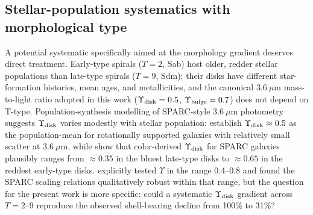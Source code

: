 \documentclass[linenumbers]{aastex701}
\newcommand{\Yt}{\Upsilon}
\newcommand{\Ydisk}{\Upsilon_{\rm disk}}
\newcommand{\Ybulge}{\Upsilon_{\rm bulge}}
\begin{document}
\subsection{Stellar-population systematics with morphological type}\label{sec:yt}

A potential systematic specifically aimed at the morphology gradient deserves direct treatment. Early-type spirals ($T=2$, Sab) host older, redder stellar populations than late-type spirals ($T=9$, Sdm); their disks have different star-formation histories, mean ages, and metallicities, and the canonical $3.6~\mu$m mass-to-light ratio adopted in this work ($\Ydisk = 0.5$, $\Ybulge = 0.7$) does not depend on T-type. Population-synthesis modelling of SPARC-style $3.6~\mu$m photometry suggests $\Ydisk$ varies modestly with stellar population: \citet{McGaugh2014} establish $\Ydisk \approx 0.5$ as the population-mean for rotationally supported galaxies with relatively small scatter at $3.6~\mu$m, while \citet{Schombert2019,Schombert2022} show that color-derived $\Ydisk$ for SPARC galaxies plausibly ranges from $\approx 0.35$ in the bluest late-type disks to $\approx 0.65$ in the reddest early-type disks. \citet{Lelli2016} explicitly tested $\Yt$ in the range 0.4--0.8 and found the SPARC scaling relations qualitatively robust within that range, but the question for the present work is more specific: could a systematic $\Ydisk$ gradient across $T=2$--$9$ reproduce the observed shell-bearing decline from 100\% to 31\%?
\end{document}
